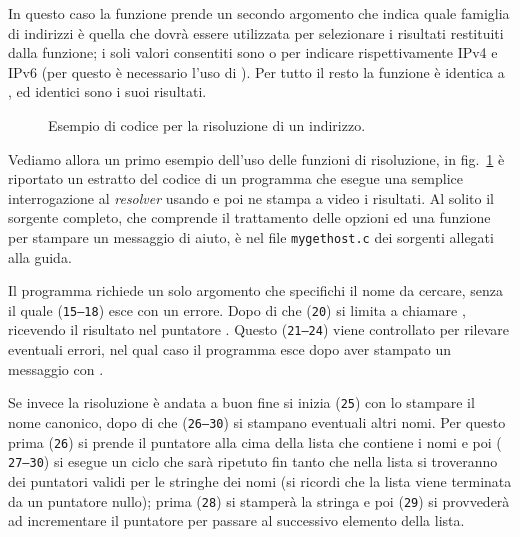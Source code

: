 In questo caso la funzione prende un secondo argomento  che indica
quale famiglia di indirizzi è quella che dovrà essere utilizzata per
selezionare i risultati restituiti dalla funzione; i soli valori consentiti
sono  o  per indicare rispettivamente IPv4 e
IPv6 (per questo è necessario l'uso di ). Per tutto il
resto la funzione è identica a , ed identici sono i suoi
risultati.

\begin{figure}[!htb]
  \footnotesize \centering
  \begin{minipage}[c]{\codesamplewidth}
  \end{minipage}
  \normalsize
  \caption{Esempio di codice per la risoluzione di un indirizzo.}
  \label{fig:mygethost_example}
\end{figure}

Vediamo allora un primo esempio dell'uso delle funzioni di risoluzione, in
fig.~\ref{fig:mygethost_example} è riportato un estratto del codice di un
programma che esegue una semplice interrogazione al \textit{resolver} usando
 e poi ne stampa a video i risultati. Al solito il
sorgente completo, che comprende il trattamento delle opzioni ed una funzione
per stampare un messaggio di aiuto, è nel file \texttt{mygethost.c} dei
sorgenti allegati alla guida.

Il programma richiede un solo argomento che specifichi il nome da cercare,
senza il quale (\texttt{\small 15--18}) esce con un errore. Dopo di che
(\texttt{\small 20}) si limita a chiamare , ricevendo il
risultato nel puntatore . Questo (\texttt{\small 21--24}) viene
controllato per rilevare eventuali errori, nel qual caso il programma esce
dopo aver stampato un messaggio con . 

Se invece la risoluzione è andata a buon fine si inizia (\texttt{\small 25})
con lo stampare il nome canonico, dopo di che (\texttt{\small 26--30}) si
stampano eventuali altri nomi. Per questo prima (\texttt{\small 26}) si prende
il puntatore alla cima della lista che contiene i nomi e poi (\texttt{\small
  27--30}) si esegue un ciclo che sarà ripetuto fin tanto che nella lista si
troveranno dei puntatori validi per le stringhe dei nomi (si ricordi che la
lista viene terminata da un puntatore nullo); prima (\texttt{\small 28}) si
stamperà la stringa e poi (\texttt{\small 29}) si provvederà ad incrementare
il puntatore per passare al successivo elemento della lista.

